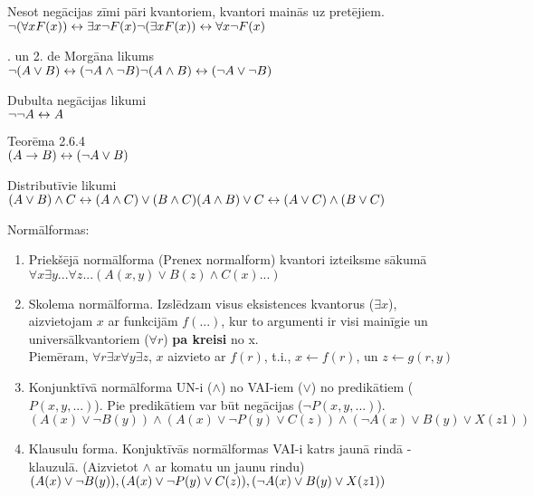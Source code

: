 \documentclass[12pt]{article}
\begin{document}
\noindent
Nesot negācijas zīmi pāri kvantoriem, kvantori mainās uz pretējiem.\\
$\neg(\forall x F(x)) \leftrightarrow \exists x\neg F(x)\\
\neg(\exists x F(x)) \leftrightarrow \forall x\neg F(x)\\
$

. un 2. de Morgāna likums\\
$\neg(A \lor B) \leftrightarrow (\neg A \land \neg B)\\
\neg(A \land B) \leftrightarrow (\neg A \lor \neg B)\\
$

\noindent
Dubulta negācijas likumi\\
$\neg\neg A \leftrightarrow A\\
$

\noindent
Teorēma 2.6.4\\
$(A \rightarrow B ) \leftrightarrow (\neg A \lor B )\\
$

\noindent
Distributīvie likumi\\
$(A \lor B) \land C \leftrightarrow (A \land C) \lor (B \land C) \\
(A \land B) \lor C \leftrightarrow (A \lor C) \land (B \lor C) \\
$

Normālformas:
\begin{enumerate}
\item
Priekšējā normālforma (Prenex normalform) kvantori izteiksme sākumā
 $\forall x \exists y ... \forall z  ... (A(x,y)\lor B(z) \land C(x) ...)$
\item
Skolema normālforma. Izslēdzam visus eksistences kvantorus ($\exists x$), aizvietojam $x$ ar funkcijām $f(...)$, kur to argumenti ir visi mainīgie un universālkvantoriem ($\forall r$) \textbf{pa kreisi} no x.\\
Piemēram, $\forall r \exists x \forall y \exists z$, $x$ aizvieto ar $f(r)$, t.i., $x \leftarrow f(r)$, un $z \leftarrow g(r,y)$
\item
Konjunktīvā normālforma UN-i ($\land$) no VAI-iem ($\lor$) no predikātiem ($P(x,y, ...)$). Pie predikātiem var būt negācijas ($\neg P(x,y, ...)$).\\
$(A(x)\lor \neg B(y))\land (A(x)\lor \neg P(y) \lor C(z)) \land (\neg A(x)\lor B(y) \lor X(z1))$
\item
Klausulu forma. Konjuktīvās normālformas VAI-i katrs jaunā rindā - klauzulā. (Aizvietot $\land$ ar komatu un jaunu rindu)\\
$(A(x)\lor \neg B(y)),\\
 (A(x)\lor \neg P(y) \lor C(z)),\\
 (\neg A(x)\lor B(y) \lor X(z1))$
\end{enumerate}
\end{document}
